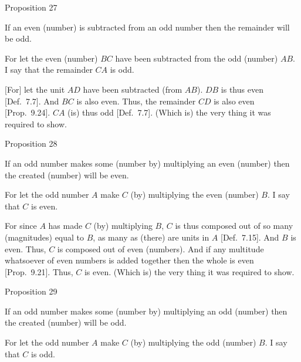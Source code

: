\begin{center}
{\large Proposition 27}
\end{center}

If an even (number) is subtracted from an odd
number then the remainder will be odd.

\epsfysize=0.3in
\centerline{}

For let the even (number) $BC$ have been subtracted from the odd (number)
$AB$. I say that the remainder $CA$ is odd.

$[$For$]$ let the unit $AD$ have been subtracted (from $AB$). $DB$ is thus
even [Def.~7.7]. And $BC$ is also even. Thus, the
remainder $CD$ is also even [Prop.~9.24]. 
$CA$ (is) thus odd [Def.~7.7]. (Which is) the
very thing it was required to show.


\begin{center}
{\large Proposition 28}
\end{center}

If an odd number makes some (number by)
multiplying an even (number) then the created (number) will be even.

\epsfysize=0.8in
\centerline{}

For let the odd number $A$ make $C$ (by) multiplying the even (number)
$B$. I say that $C$ is even.

For since $A$ has made $C$ (by) multiplying $B$, $C$ is thus composed  out of so many (magnitudes) equal to $B$, as many as (there) are  units in $A$ [Def.~7.15]. And $B$ is even. Thus, $C$ is composed
out of even (numbers). And if any multitude whatsoever of even numbers
is added together then the whole is even [Prop.~9.21]. 
Thus, $C$ is even. (Which is) the very thing it was required to show.


\begin{center}
{\large Proposition 29}
\end{center}

If  an odd number makes some (number by)
multiplying an odd (number) then the created (number) will be odd.

\epsfysize=0.8in
\centerline{}

For let the odd number $A$ make $C$ (by) multiplying the odd (number)
$B$. I say that $C$ is odd.

